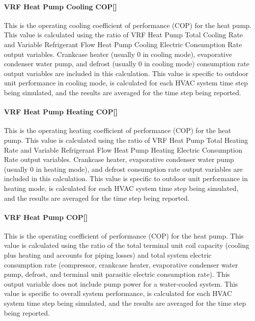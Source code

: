 \paragraph{\texorpdfstring{VRF Heat Pump Cooling COP{[]}}{VRF Heat Pump Cooling COP}}\label{vrf-heat-pump-cooling-cop}

This is the operating cooling coefficient of performance (COP) for the heat pump. This value is calculated using the ratio of VRF Heat Pump Total Cooling Rate and Variable Refrigerant Flow Heat Pump Cooling Electric Consumption Rate output variables. Crankcase heater (usually 0 in cooling mode), evaporative condenser water pump, and defrost (usually 0 in cooling mode) consumption rate output variables are included in this calculation. This value is specific to outdoor unit performance in cooling mode, is calculated for each HVAC system time step being simulated, and the results are averaged for the time step being reported.

\paragraph{\texorpdfstring{VRF Heat Pump Heating COP{[]}}{VRF Heat Pump Heating COP}}\label{vrf-heat-pump-heating-cop}

This is the operating heating coefficient of performance (COP) for the heat pump. This value is calculated using the ratio of VRF Heat Pump Total Heating Rate and Variable Refrigerant Flow Heat Pump Heating Electric Consumption Rate output variables. Crankcase heater, evaporative condenser water pump (usually 0 in heating mode), and defrost consumption rate output variables are included in this calculation. This value is specific to outdoor unit performance in heating mode, is calculated for each HVAC system time step being simulated, and the results are averaged for the time step being reported.

\paragraph{\texorpdfstring{VRF Heat Pump COP{[]}}{VRF Heat Pump COP}}\label{vrf-heat-pump-cop}

This is the operating coefficient of performance (COP) for the heat pump. This value is calculated using the ratio of the total terminal unit coil capacity (cooling plus heating and accounts for piping losses) and total system electric consumption rate (compressor, crankcase heater, evaporative condenser water pump, defrost, and terminal unit parasitic electric consumption rate). This output variable does not include pump power for a water-cooled system. This value is specific to overall system performance, is calculated for each HVAC system time step being simulated, and the results are averaged for the time step being reported.

